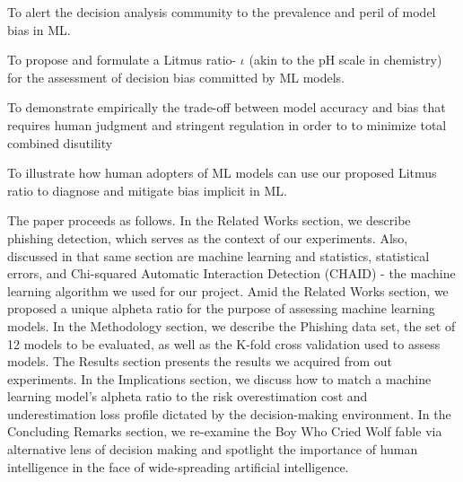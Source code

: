 \documentclass[deca,nonblindrev]{informs3} %
\begin{document}
\begin{henumerate}
\item To alert the decision analysis  community to the prevalence and peril of model bias in ML.

\item To propose and formulate a  Litmus ratio- $\iota$ (akin to the pH scale in chemistry) for the assessment of decision bias committed by  ML  models.
\item To demonstrate empirically the trade-off between model accuracy and bias that  requires human judgment and stringent regulation in order to to minimize total combined  disutility
\item To illustrate  how human adopters of ML models can use our proposed Litmus ratio to diagnose and mitigate bias implicit in ML.
 
\end{henumerate}

The paper proceeds as follows. In the Related Works section, we describe phishing detection, which serves as the context of our experiments. Also, discussed in that same section are machine learning and statistics, statistical errors, and Chi-squared Automatic Interaction Detection (CHAID) - the machine learning algorithm we used for our project. Amid the Related Works section, we proposed a unique  alpheta ratio for the purpose of assessing machine learning models. In the Methodology section, we describe the Phishing data set, the set of 12 models to be evaluated, as well as the K-fold cross validation used to assess models. The Results section presents the results we acquired from out experiments. In the Implications section, we discuss how to match a machine learning model’s  alpheta  ratio to the risk overestimation cost and underestimation loss profile dictated by the decision-making environment. In the Concluding Remarks section, we re-examine the Boy Who Cried Wolf fable via alternative lens of decision making and spotlight the importance of human intelligence in the face of wide-spreading artificial intelligence. 
\end{document}
